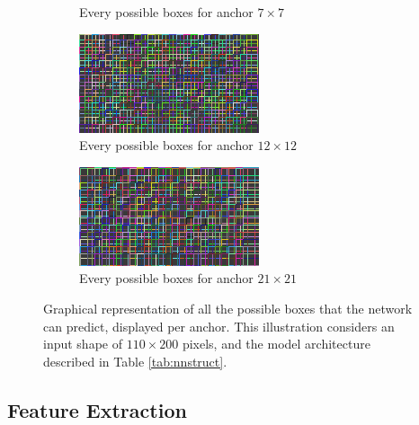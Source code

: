 \begin{figure}
\begin{center}
\begin{subfigure}[t]{.49\linewidth}
      \caption{Every possible boxes for anchor $7\times7$}
    \end{subfigure}
    \begin{subfigure}[t]{.49\linewidth}
      \centering
      \includegraphics[width=0.99\linewidth]{figures/anchors/boxes_layers_3.png}
      \caption{Every possible boxes for anchor $12\times12$}
    \end{subfigure}
    \begin{subfigure}[t]{.49\linewidth}
      \centering
      \includegraphics[width=0.99\linewidth]{figures/anchors/boxes_layers_4.png}
      \caption{Every possible boxes for anchor $21\times21$}
    \end{subfigure}
    \caption{Graphical representation of all the possible boxes that the network can predict, displayed per anchor. This illustration considers an input shape of $110\times200$ pixels, and the model architecture described in Table \ref{tab:nnstruct}.}
    \label{fig:anchors}
  \end{center}
\end{figure}


\subsection{Feature Extraction}
